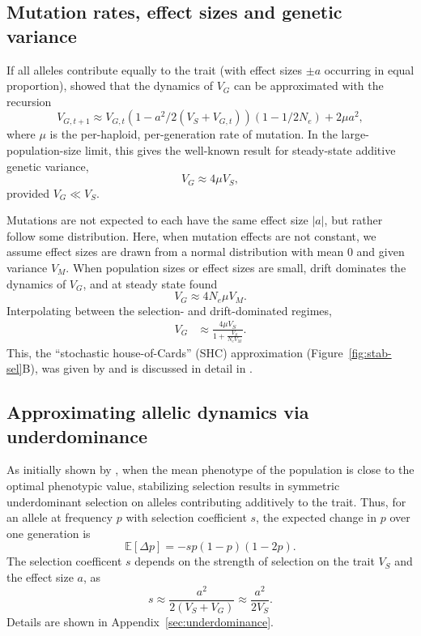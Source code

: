 \documentclass{article}
\newcommand{\E}{\mathbb{E}}
\begin{document}
\subsection*{Mutation rates, effect sizes and genetic variance}

If all alleles contribute equally to the trait
(with effect sizes \(\pm a\) occurring in equal proportion),
\citet{keightley1988quantitative} showed that the dynamics of $V_G$ can be
approximated with the recursion
\[V_{G,t+1} \approx V_{G,t}\left(1-a^2/2(V_S+V_{G,t})\right)
\left(1-1/2N_e\right) + 2 \mu a^2,\]
where $\mu$ is the per-haploid, per-generation rate of mutation. In the
large-population-size limit, this gives the well-known result for
steady-state additive genetic variance,
\[V_G \approx 4\mu V_S,\] provided \(V_G \ll V_S\).

Mutations are not expected to each have the same effect size $|a|$, but rather
follow some distribution. Here, when mutation effects are not constant, we
assume effect sizes are drawn from a normal distribution with mean 0 and given
variance $V_M$. When population sizes or effect sizes are small, drift
dominates the dynamics of $V_G$, and at steady state \citet{lande1976natural}
found \[V_G \approx 4 N_e \mu V_M.\] Interpolating between the selection- and
drift-dominated regimes,
\begin{align}\label{eq:SHC}
    V_G & \approx \frac{4 \mu V_S}{1 + \frac{V_S}{N_e V_M}}.
\end{align}
This, the ``stochastic
house-of-Cards'' (SHC) approximation (Figure~\ref{fig:stab-sel}B), was given by
\citet{burger1989much} and is discussed in detail in \citet[][Ch.
28]{walsh2018evolution}.

\subsection*{Approximating allelic dynamics via underdominance}

As initially shown by \citet{robertson1956effect} \citep[see
also,][]{keightley1988quantitative, simons2018population}, when the mean
phenotype of the population is close to the optimal phenotypic value,
stabilizing selection results in symmetric underdominant selection on alleles
contributing additively to the trait. Thus, for an allele at frequency $p$ with
selection coefficient $s$, the expected change in $p$ over one generation is
\begin{equation}
    \E[\Delta p] = -sp(1-p)(1-2p).
\end{equation}
The selection coefficent $s$ depends on the strength of selection on the trait
$V_S$ and the effect size $a$, as 
\begin{equation}
    s\approx \frac{a^2}{2(V_S+V_G)} \approx \frac{a^2}{2V_S}.
\end{equation}
Details are shown in Appendix~\ref{sec:underdominance}.
\end{document}
